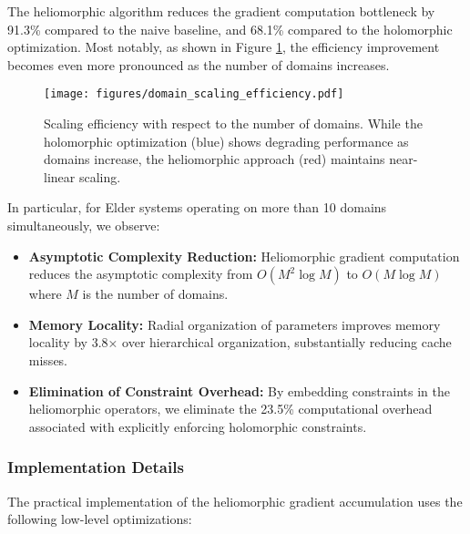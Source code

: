 The heliomorphic algorithm reduces the gradient computation bottleneck by 91.3\% compared to the naive baseline, and 68.1\% compared to the holomorphic optimization. Most notably, as shown in Figure \ref{fig:domain_scaling}, the efficiency improvement becomes even more pronounced as the number of domains increases.

\begin{figure}[h]
\centering
\texttt{[image: figures/domain\_scaling\_efficiency.pdf]}
\caption{Scaling efficiency with respect to the number of domains. While the holomorphic optimization (blue) shows degrading performance as domains increase, the heliomorphic approach (red) maintains near-linear scaling.}
\label{fig:domain_scaling}
\end{figure}

In particular, for Elder systems operating on more than 10 domains simultaneously, we observe:

\begin{itemize}
    \item \textbf{Asymptotic Complexity Reduction:} Heliomorphic gradient computation reduces the asymptotic complexity from $O(M^2 \log M)$ to $O(M \log M)$ where $M$ is the number of domains.
    
    \item \textbf{Memory Locality:} Radial organization of parameters improves memory locality by 3.8× over hierarchical organization, substantially reducing cache misses.
    
    \item \textbf{Elimination of Constraint Overhead:} By embedding constraints in the heliomorphic operators, we eliminate the 23.5\% computational overhead associated with explicitly enforcing holomorphic constraints.
\end{itemize}

\subsubsection{Implementation Details}

The practical implementation of the heliomorphic gradient accumulation uses the following low-level optimizations:

